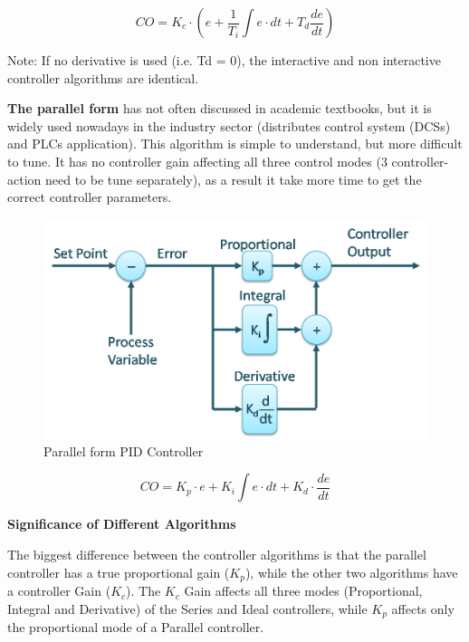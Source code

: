 \begin{equation}
	\label{eqn:2}
	CO = K_c\cdot\left(e + \frac{1}{T_i}\int e\cdot dt +T_d\frac{de}{dt} \right)
\end{equation}


Note: If no derivative is used (i.e. Td = 0), the interactive and non interactive controller algorithms are identical. 

\textbf{The parallel form} has not often discussed in academic textbooks, but it is widely used nowadays in the  industry sector (distributes control system (DCSs) and PLCs application). This algorithm is simple to understand, but more difficult to tune. It has no controller gain affecting all three control modes (3 controller-action need to be tune separately), as a result it take more time to get the correct controller parameters. 


\begin{figure}[H]
	\centering
	\includegraphics[width=0.8\columnwidth]{Pictures/parallel.png}
	\caption[Short title]{Parallel form PID Controller \cite{PID}}
	\label{figure: Parallel PID}
\end{figure}

\begin{equation}
	\label{eqn:3}
	CO = K_p\cdot e + K_i\int e\cdot dt +K_d\cdot\frac{de}{dt}
\end{equation}

\textbf{Significance of Different Algorithms }

The biggest difference between the controller algorithms is that the parallel controller has a true proportional gain ($K_p$), while the other two algorithms have a controller Gain ($K_c$). The  $K_c$ Gain affects all three modes (Proportional, Integral and Derivative) of the Series and Ideal controllers, while $K_p$  affects only the proportional mode of a Parallel controller. 

